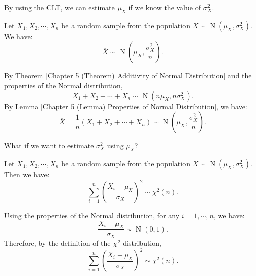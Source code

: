 \documentclass{huhtakm-template-book-v2}
\DeclareMathOperator{\N}{N}
\begin{document}
    By using the CLT, we can estimate $\mu_{X}$ if we know the value of $\sigma_{X}^{2}$.
    \begin{thm}
        \label{Chapter 7 (Theorem) Sampling distribution with sample mean}
        Let $X_{1},X_{2},\cdots,X_{n}$ be a random sample from the population $X \sim \N(\mu_{X},\sigma_{X}^{2})$. We have:
        \begin{equation*}
            \overline{X} \sim \N\left(\mu_{X},\frac{\sigma_{X}^{2}}{n}\right).
        \end{equation*}
    \end{thm}
    \begin{proofing}
        By Theorem \ref{Chapter 5 (Theorem) Additivity of Normal Distribution} and the properties of the Normal distribution,
        \begin{equation*}
            X_{1}+X_{2}+\cdots+X_{n} \sim \N(n\mu_{X},n\sigma_{X}^{2}).
        \end{equation*}
        By Lemma \ref{Chapter 5 (Lemma) Properties of Normal Distribution}, we have:
        \begin{equation*}
            \overline{X} = \frac{1}{n}(X_{1}+X_{2}+\cdots+X_{n}) \sim \N\left(\mu_{X},\frac{\sigma_{X}^{2}}{n}\right).
        \end{equation*}
    \end{proofing}
    What if we want to estimate $\sigma_{X}^{2}$ using $\mu_{X}$?
    \begin{thm}
        \label{Chapter 7 (Theorem) Sampling distribution with known mean}
        Let $X_{1},X_{2},\cdots,X_{n}$ be a random sample from the population $X \sim \N(\mu_{X},\sigma_{X}^{2})$. Then we have:
        \begin{equation*}
            \sum_{i = 1}^{n}\left(\frac{X_{i}-\mu_{X}}{\sigma_{X}}\right)^{2} \sim \chi^{2}(n).
        \end{equation*}
    \end{thm}
    \begin{proofing}
        Using the properties of the Normal distribution, for any $i = 1,\cdots,n$, we have:
        \begin{equation*}
            \frac{X_{i}-\mu_{X}}{\sigma_{X}} \sim \N(0,1).
        \end{equation*}
        Therefore, by the definition of the $\chi^{2}$-distribution,
        \begin{equation*}
            \sum_{i = 1}^{n}\left(\frac{X_{i}-\mu_{X}}{\sigma_{X}}\right)^{2} \sim \chi^{2}(n).
        \end{equation*}
    \end{proofing}
    \newpage
\end{document}
